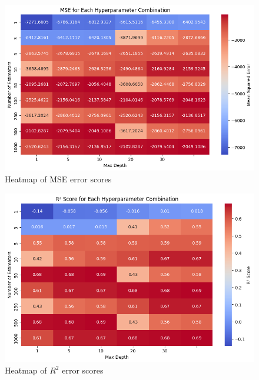\documentclass[a4paper]{article}
\begin{document}
\noindent
\begin{minipage}{0.49\textwidth} 
\begin{figure}[H]
    \centering
    \includegraphics[width=\textwidth]{./images/rfr_mse.jpg}
    \caption{Heatmap of MSE error scores}
\end{figure}
\end{minipage}
\begin{minipage}{0.49\textwidth} 
\begin{figure}[H]
    \centering
    \includegraphics[width=\textwidth]{./images/rfr_r2.jpg}
    \caption{Heatmap of $R^2$ error scores}
\end{figure}
\end{minipage}
\end{document}
